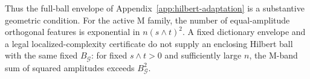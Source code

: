 Thus the full-ball envelope of Appendix~\ref{app:hilbert-adaptation}
is a substantive geometric condition. For the active M family,
the number of equal-amplitude orthogonal features is exponential
in $n(s\wedge t)^2$. A fixed dictionary envelope and a legal
localized-complexity certificate do not supply an enclosing
Hilbert ball with the same fixed $B_{\mathcal G}$: for fixed
$s\wedge t>0$ and sufficiently large $n$, the M-band sum of squared
amplitudes exceeds $B_{\mathcal G}^2$.

